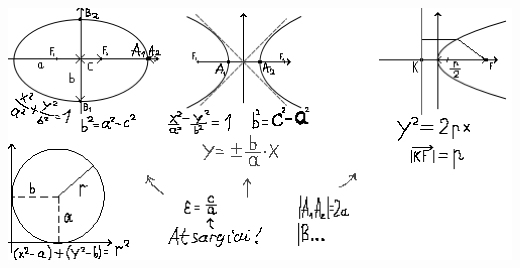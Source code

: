 \documentclass[fleqn]{article} %
\begin{document}
\begin{center} \includegraphics[scale=0.5]{assets/antros-eiles-kreives-2x.png} \end{center}

\end{document}

